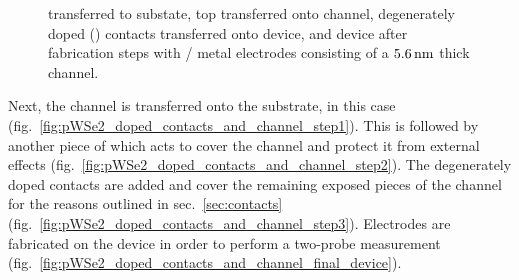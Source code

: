 \begin{figure}
{		\label{fig:pWSe2_doped_contacts_and_channel_step3}
	}
	\qquad
	\caption[Fabrication steps of \lightlyone channel with \degenerate\, contacts]{\protect{} \lightlyone transferred to \hbn substate,  \protect{} top \hbn transferred onto channel, \protect{} degenerately doped (\degenerate) contacts transferred onto device, and \protect{} device after fabrication steps with / metal electrodes consisting of a $5.6\,\mathrm{nm}$ thick channel.}
	\label{fig:hBN_field_effect_device_fab}
\end{figure}
Next, the channel is transferred onto the \hbn substrate, in this case \lightlyone (fig.~\ref{fig:pWSe2_doped_contacts_and_channel_step1}). This is followed by another piece of \hbn which acts to cover the channel and protect it from external effects (fig.~\ref{fig:pWSe2_doped_contacts_and_channel_step2}). The degenerately doped contacts are added and cover the remaining exposed pieces of the channel for the reasons outlined in sec.~\ref{sec:contacts} (fig.~\ref{fig:pWSe2_doped_contacts_and_channel_step3}). Electrodes are fabricated on the device in order to perform a two-probe measurement (fig.~\ref{fig:pWSe2_doped_contacts_and_channel_final_device}). 

